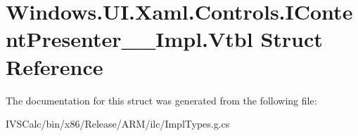 \hypertarget{struct_windows_1_1_u_i_1_1_xaml_1_1_controls_1_1_i_content_presenter_____impl_1_1_vtbl}{}\section{Windows.\+U\+I.\+Xaml.\+Controls.\+I\+Content\+Presenter\+\_\+\+\_\+\+Impl.\+Vtbl Struct Reference}
\label{struct_windows_1_1_u_i_1_1_xaml_1_1_controls_1_1_i_content_presenter_____impl_1_1_vtbl}


The documentation for this struct was generated from the following file\+:\begin{DoxyCompactItemize}
\item 
I\+V\+S\+Calc/bin/x86/\+Release/\+A\+R\+M/ilc/Impl\+Types.\+g.\+cs\end{DoxyCompactItemize}

